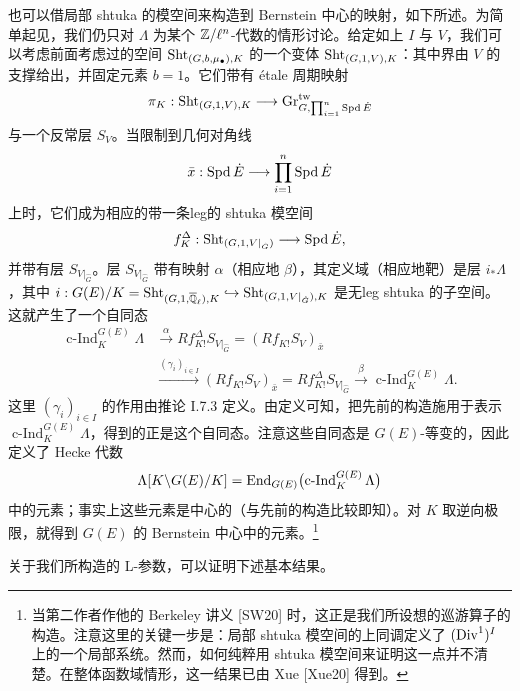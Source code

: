 也可以借局部 shtuka 的模空间来构造到 Bernstein 中心的映射，如下所述。为简单起见，我们仍只对 $\Lambda$ 为某个 $\mathbb{Z}/\ell^n$-代数的情形讨论。给定如上 $I$ 与 $V$，我们可以考虑前面考虑过的空间 $\operatorname{Sht}_{(G,b,\mu_\bullet),K}$ 的一个变体 $\operatorname{Sht}_{(G,1,V),K}$：其中界由 $V$ 的支撑给出，并固定元素 $b=1$。它们带有 étale 周期映射
\[
\pi_K:\operatorname{Sht}_{(G,1,V),K}\longrightarrow\mathrm{Gr}^{\mathrm{tw}}_{G,\prod_{i=1}^{n}\operatorname{Spd}\dot E}
\]
与一个反常层 $S_V$。当限制到几何对角线
\[
\bar x:\operatorname{Spd}\dot E\longrightarrow\prod_{i=1}^{n}\operatorname{Spd}\dot E
\]
上时，它们成为相应的带一条leg的 shtuka 模空间
\[
f^\Delta_K:\operatorname{Sht}_{(G,1,V|_{\hat G})}\longrightarrow\operatorname{Spd}\dot E,
\]
并带有层 $S_{V|_{\hat G}}$。层 $S_{V|_{\hat G}}$ 带有映射 $\alpha$（相应地 $\beta$），其定义域（相应地靶）是层 $i_*\Lambda$，其中 $i:G(E)/K=\operatorname{Sht}_{(G,1,\overline{\mathbb{Q}}_\ell),K}\hookrightarrow\operatorname{Sht}_{(G,1,V|_{\hat G}),K}$ 是无leg shtuka 的子空间。这就产生了一个自同态
\begin{align*}
\operatorname{c-Ind}_K^{G(E)}\Lambda &\xrightarrow{\alpha}Rf^\Delta_{K!}S_{V|_{\hat G}}=(Rf_{K!}S_V)_{\bar x}\\
&\xrightarrow{(\gamma_i)_{i\in I}}(Rf_{K!}S_V)_{\bar x}=Rf^\Delta_{K!}S_{V|_{\hat G}}\xrightarrow{\beta}\operatorname{c-Ind}_K^{G(E)}\Lambda.
\end{align*}
这里 $(\gamma_i)_{i\in I}$ 的作用由推论 I.7.3 定义。由定义可知，把先前的构造施用于表示 $\operatorname{c-Ind}_K^{G(E)}\Lambda$，得到的正是这个自同态。注意这些自同态是 $G(E)$-等变的，因此定义了 Hecke 代数
\[
\Lambda[K\backslash G(E)/K]=\operatorname{End}_{G(E)}\bigl(\operatorname{c-Ind}_K^{G(E)}\Lambda\bigr)
\]
中的元素；事实上这些元素是中心的（与先前的构造比较即知）。对 $K$ 取逆向极限，就得到 $G(E)$ 的 Bernstein 中心中的元素。\footnote{当第二作者作他的 Berkeley 讲义 [SW20] 时，这正是我们所设想的巡游算子的构造。注意这里的关键一步是：局部 shtuka 模空间的上同调定义了 $(\mathrm{Div}^1)^I$ 上的一个局部系统。然而，如何纯粹用 shtuka 模空间来证明这一点并不清楚。在整体函数域情形，这一结果已由 Xue [Xue20] 得到。}

关于我们所构造的 L-参数，可以证明下述基本结果。

